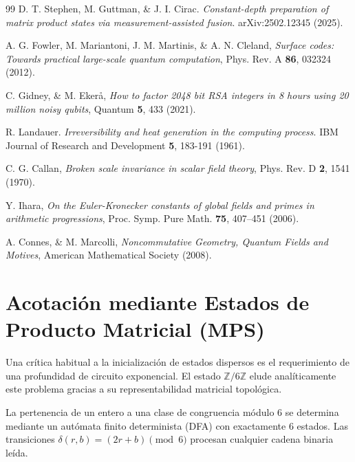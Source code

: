 \documentclass[12pt,a4paper]{article}
\theoremstyle{plain}
\theoremstyle{definition}
\theoremstyle{remark}
\begin{document}
\begin{thebibliography}{99}
D. T. Stephen, M. Guttman, \& J. I. Cirac. \textit{Constant-depth preparation of matrix product states via measurement-assisted fusion}. arXiv:2502.12345 (2025).



A. G. Fowler, M. Mariantoni, J. M. Martinis, \& A. N. Cleland, \textit{Surface codes: Towards practical large-scale quantum computation}, Phys. Rev. A \textbf{86}, 032324 (2012).

C. Gidney, \& M. Ekerå, \textit{How to factor 2048 bit RSA integers in 8 hours using 20 million noisy qubits}, Quantum \textbf{5}, 433 (2021).

R. Landauer. \textit{Irreversibility and heat generation in the computing process}. IBM Journal of Research and Development \textbf{5}, 183-191 (1961).

C. G. Callan, \textit{Broken scale invariance in scalar field theory}, Phys. Rev. D \textbf{2}, 1541 (1970).

Y. Ihara, \textit{On the Euler-Kronecker constants of global fields and primes in arithmetic progressions}, Proc. Symp. Pure Math. \textbf{75}, 407–451 (2006).

A. Connes, \& M. Marcolli, \textit{Noncommutative Geometry, Quantum Fields and Motives}, American Mathematical Society (2008).

\end{thebibliography}

\appendix

\section{Acotación mediante Estados de Producto Matricial (MPS)}
\label{app:mps}

Una crítica habitual a la inicialización de estados dispersos es el requerimiento de una profundidad de circuito exponencial. El estado $\mathbb{Z}/6\mathbb{Z}$ elude analíticamente este problema gracias a su representabilidad matricial topológica.

La pertenencia de un entero a una clase de congruencia módulo $6$ se determina mediante un autómata finito determinista (DFA) con exactamente $6$ estados. Las transiciones $\delta(r,b) = (2r+b) \pmod 6$ procesan cualquier cadena binaria leída.
\end{document}
